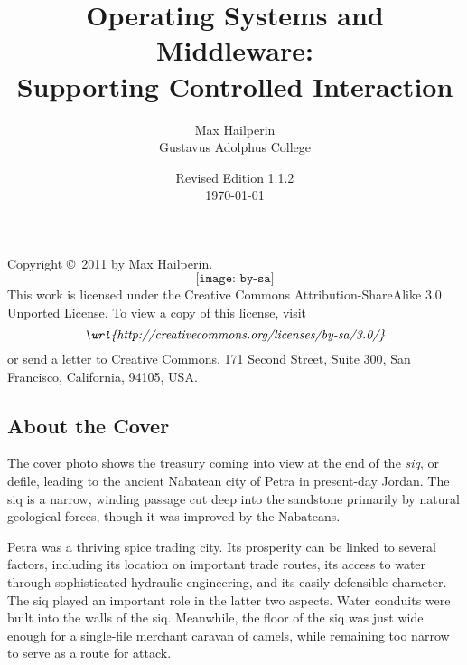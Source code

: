 \documentclass[11pt]{book}
\title{Operating Systems and Middleware:\\Supporting Controlled Interaction}
\author{Max Hailperin\\Gustavus Adolphus College}
\date{Revised Edition 1.1.2\\\today}
\begin{document}

\frontmatter
\iffancytitlepage
{}
\makeatletter
{}%
\makeatother
\else
\maketitle
\fi

\clearpage\thispagestyle{empty}
\noindent Copyright \copyright\ 2011 by Max Hailperin.
\[\texttt{[image: by-sa]}\]
This work is licensed under the Creative Commons Attribution-ShareAlike 3.0 Unported License. To view a copy of this
license, visit
\[ \textit{\url{http://creativecommons.org/licenses/by-sa/3.0/}} \]
or send a letter to Creative Commons, 171 Second Street,
Suite 300, San Francisco, California, 94105, USA.
\iffancytitlepage
\subsection*{About the Cover}
The cover photo shows the treasury coming into view at the end of the \textit{siq}, or defile, leading to the ancient Nabatean city of Petra in present-day Jordan. The siq is a narrow, winding passage cut deep into the sandstone primarily by natural geological forces, though it was improved by the Nabateans.

Petra was a thriving spice trading city. Its prosperity can be linked to several factors, including its location on important trade routes, its access to water through sophisticated hydraulic engineering, and its easily defensible character. The siq played an important role in the latter two aspects. Water conduits were built into the walls of the siq. Meanwhile, the floor of the siq was just wide enough for a single-file merchant caravan of camels, while remaining too narrow to serve as a route for attack.
\end{document}
